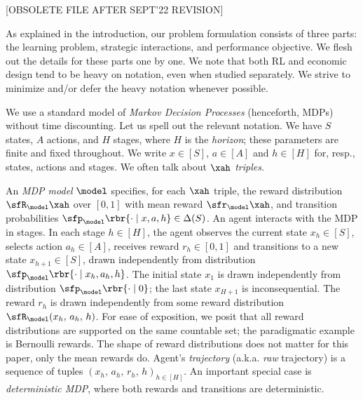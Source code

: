 
[OBSOLETE FILE AFTER SEPT'22 REVISION]

As explained in the introduction, our problem formulation consists of three parts: the learning problem, strategic interactions, and performance objective. We flesh out the details for these parts one by one. We note that both RL and economic design tend to be heavy on notation, even when studied separately.  We strive to minimize and/or defer the heavy notation whenever possible.

 We use a standard model of \emph{Markov Decision Processes} (henceforth, MDPs) without time discounting. Let us spell out the relevant notation. We have $S$ states, $A$ actions, and $H$ stages, where $H$ is the \emph{horizon}; these parameters are finite and fixed throughout. We write
    $x\in[S]$, $a\in[A]$ and $h\in[H]$
for, resp., states, actions and stages. We often talk about $\xah$ \emph{triples}.

{An \emph{MDP model} $\model$ specifies, for each $\xah$ triple,
the reward distribution
    $\sfR_{\model}\xah$
over $[0,1]$ with mean reward
    $\sfr_{\model}\xah$,
and transition probabilities
    $\sfp_{\model}\rbr{\cdot \mid x,a,h} \in \Delta(S)$.}
An agent interacts with the MDP in stages. In each stage $h\in[H]$, the agent observes the current state $x_h\in[S]$, selects action $a_h\in[A]$, receives  reward $r_h\in[0,1]$ and transitions to a new state $x_{h+1}\in[S]$,
drawn independently from distribution
    $\sfp_{\model}\rbr{\cdot \mid x_h,a_h,h}$.
The initial state $x_1$ is drawn independently from distribution
    $\sfp_{\model}\rbr{\cdot \mid 0}$;
the last state $x_{H+1}$ is inconsequential.
The reward $r_h$ is drawn independently from some reward distribution
    $\sfR_{\model}(x_h,\, a_h,\, h)$.
For ease of exposition, we posit that all reward distributions are supported on the same countable set; the paradigmatic example is Bernoulli rewards. The shape of reward distributions does not matter for this paper, only the mean rewards do. Agent's \emph{trajectory} (a.k.a. \emph{raw} trajectory) is a sequence of tuples
    $(x_h,\,a_h,\, r_h,\,h)_{h\in[H]}$.
{An important special case is \emph{deterministic MDP}, where both rewards and transitions are deterministic.}


